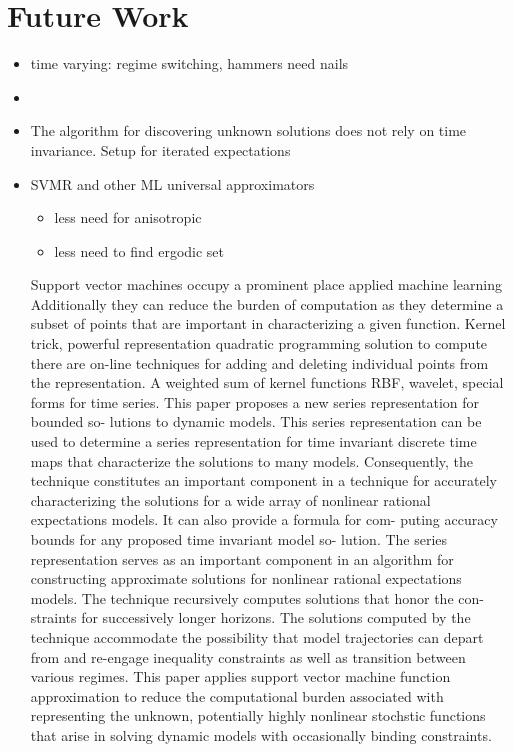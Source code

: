 \documentclass[12pt]{article}
\begin{document}
\section{Future Work}
\label{sec:future}

\begin{itemize}
\item time varying:  regime switching, hammers need nails
\item   \item The algorithm for discovering unknown solutions does not rely on time invariance.  Setup for iterated expectations
\item SVMR and other ML universal approximators


  \begin{itemize}
  \item less need for anisotropic
  \item less need to find ergodic set
  \end{itemize}




Support vector machines occupy a prominent place applied machine learning
Additionally they can reduce the burden of computation as they determine 
a subset of points that are important in characterizing a given function.
Kernel trick,  powerful representation quadratic programming solution to compute there are on-line techniques for adding and deleting individual points from the representation.  A weighted sum of kernel functions RBF, wavelet, special forms for time series.
  This paper proposes a new series representation for bounded so-
lutions to dynamic models. This series representation can be used
to determine a series representation for time invariant discrete time
maps that characterize the solutions to many models. Consequently,
the technique constitutes an important component in a technique for
accurately characterizing the solutions for a wide array of nonlinear
rational expectations models. It can also provide a formula for com-
puting accuracy bounds for any proposed time invariant model so-
lution. The series representation serves as an important component
in an algorithm for constructing approximate solutions for nonlinear
rational expectations models.
The technique recursively computes solutions that honor the con-
straints for successively longer horizons.  The solutions computed by
the technique accommodate the possibility that model trajectories can
depart from and re-engage inequality constraints as well as transition
between various regimes.
This paper applies support vector machine function approximation to
reduce the computational burden associated with representing the
unknown, potentially highly nonlinear stochstic functions that arise in
solving dynamic models with occasionally binding constraints.



\end{itemize}
\end{document}
